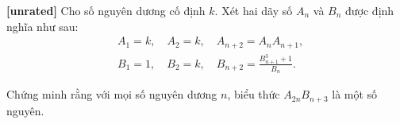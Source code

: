 \documentclass[../09-contruction-methods.tex]{subfiles}
\begin{document}
\begin{exercise*}\label{example:KOR-2015-FR-P1}\textbf{[unrated]}
	Cho số nguyên dương cố định $k$. Xét hai dãy số $A_n$ và $B_n$ được định nghĩa như sau:
	\begin{align*}
		&A_1 = k, \quad A_2 = k, \quad A_{n+2} = A_n A_{n+1}, \\
		&B_1 = 1, \quad B_2 = k, \quad B_{n+2} = \frac{B_{n+1}^3 + 1}{B_n}.
	\end{align*}
	
	Chứng minh rằng với mọi số nguyên dương $n$, biểu thức $A_{2n}B_{n+3}$ là một số nguyên.
\end{exercise*}
\end{document}

